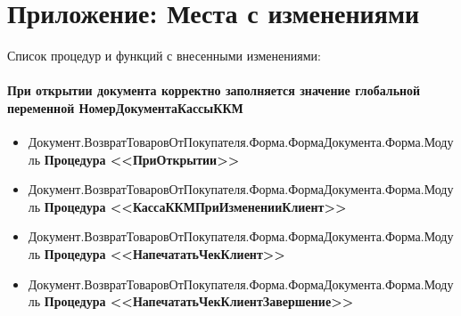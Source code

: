 \section{Приложение: Места с изменениями}
 Список процедур и функций с внесенными изменениями:\par

\paragraph{При открытии документа корректно заполняется значение глобальной переменной НомерДокументаКассыККМ}\label{2001}
\begin{itemize}
    \item Документ.ВозвратТоваровОтПокупателя.Форма.ФормаДокумента.Форма.Модуль
    \textbf{Процедура <<ПриОткрытии>>}
     \item Документ.ВозвратТоваровОтПокупателя.Форма.ФормаДокумента.Форма.Модуль
    \textbf{Процедура <<КассаККМПриИзмененииКлиент>>}
    \item Документ.ВозвратТоваровОтПокупателя.Форма.ФормаДокумента.Форма.Модуль
   \textbf{ Процедура <<НапечататьЧекКлиент>>}
     \item Документ.ВозвратТоваровОтПокупателя.Форма.ФормаДокумента.Форма.Модуль
    \textbf{Процедура <<НапечататьЧекКлиентЗавершение>>}
\end{itemize}